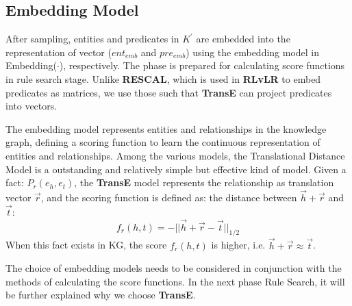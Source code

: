\documentclass{article}
\begin{document}
		
	\subsection{Embedding Model}
	After sampling, entities and predicates in $K^{'}$ are embedded into the representation of vector ($ent_{emb}$ and $pre_{emb}$) using the embedding model  in \textsf{Embedding($\cdot$)}, respectively. The phase is prepared for calculating score functions in rule search stage. Unlike {\bf RESCAL}, which is used in {\bf RLvLR} to embed predicates as matrices, we use those such that {\bf TransE} can project predicates into vectors.

	The embedding model represents entities and relationships in the knowledge graph, defining a scoring function to learn the continuous representation of entities and relationships. Among the various models, the Translational Distance Model is a outstanding and relatively simple but effective kind of model.
	Given a fact: $P_r(e_h,e_t)$, the {\bf TransE} model represents the relationship as translation vector $\vec{r}$, and the scoring function is defined as: the distance between $\vec{h}+\vec{r}$ and $\vec{t}$: 
	\begin{equation}
	f_r(h, t) = -||\vec{h}+\vec{r} -\vec{t}||_{1/2}
	\label{eq:transe}
	\end{equation}
	When this fact exists in KG, the score $f_r(h,t)$ is higher, i.e. $\vec{h}+\vec{r} \approx \vec{t}$.
	
	The choice of embedding models needs to be considered in conjunction with the methods of calculating the score functions. In the next phase Rule Search, it will be further explained why we choose {\bf TransE}.
	
\end{document}
